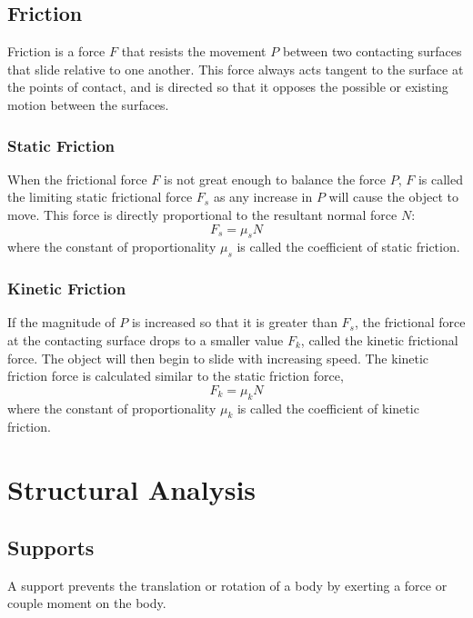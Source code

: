 \documentclass{article}
\begin{document}
\subsection{Friction}
Friction is a force \(F\) that resists the movement \(P\) between two contacting surfaces that slide relative to
one another. This force always acts tangent to the surface at the points of contact, and is directed
so that it opposes the possible or existing motion between the surfaces.
\subsubsection{Static Friction}
When the frictional force \(F\) is not great enough to balance the force \(P\),
\(F\) is called the limiting static frictional force \(F_s\) as any increase in \(P\)
will cause the object to move. This force is directly proportional to the resultant
normal force \(N\):
\begin{equation*}
    F_s = \mu_s N
\end{equation*}
where the constant of proportionality \(\mu_s\) is called the coefficient of static friction.
\subsubsection{Kinetic Friction}
If the magnitude of \(P\) is increased so that it is greater than \(F_s\), the frictional force
at the contacting surface drops to a smaller value \(F_k\), called the kinetic frictional force.
The object will then begin to slide with increasing speed. The kinetic friction force is calculated
similar to the static friction force,
\begin{equation*}
    F_k = \mu_k N
\end{equation*}
where the constant of proportionality \(\mu_k\) is called the coefficient of kinetic friction.
\section{Structural Analysis}
\subsection{Supports}
A support prevents the translation or rotation of a body by exerting a force or couple moment on the body.
\end{document}
